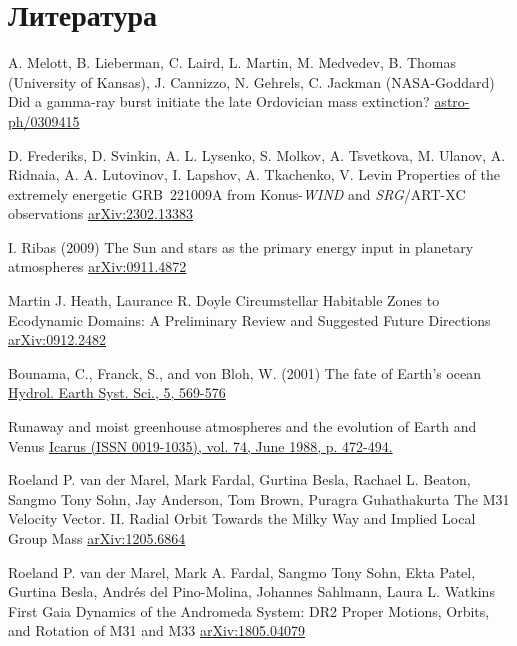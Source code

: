 \documentclass[aspectratio=169]{beamer}
\begin{document}
\section{Литература}
\begin{frame}[allowframebreaks]
\footnotesize{

\begin{thebibliography}{99}
%
A. Melott, B. Lieberman, C. Laird, L. Martin, M. Medvedev, B. Thomas (University of Kansas), J. Cannizzo, N. Gehrels, C. Jackman (NASA-Goddard) 
\newblock Did a gamma-ray burst initiate the late Ordovician mass extinction?
\newblock \href{http://arxiv.org/abs/astro-ph/0309415}{astro-ph/0309415}

%
D. Frederiks, D. Svinkin, A. L. Lysenko, S. Molkov, A. Tsvetkova, M. Ulanov, A. Ridnaia, A. A. Lutovinov, I. Lapshov, A. Tkachenko, V. Levin
\newblock Properties of the extremely energetic GRB~221009A from Konus-\textit{WIND} and \textit{SRG}/ART-XC observations
\newblock \href{http://arxiv.org/abs/2302.13383}{arXiv:2302.13383}


I. Ribas (2009)
\newblock The Sun and stars as the primary energy input in planetary atmospheres
\newblock \href{http://arxiv.org/abs/0911.4872}{arXiv:0911.4872}

Martin J. Heath, Laurance R. Doyle
\newblock Circumstellar Habitable Zones to Ecodynamic Domains: A Preliminary Review and Suggested Future Directions
\newblock \href{http://arxiv.org/abs/0912.2482}{arXiv:0912.2482}

Bounama, C., Franck, S., and von Bloh, W. (2001)
\newblock The fate of Earth's ocean
\newblock \href{http://doi.org/10.1016/0019-1035(88)90116-9}{Hydrol. Earth Syst. Sci., 5, 569-576}

\newblock Runaway and moist greenhouse atmospheres and the evolution of Earth and Venus
\newblock \href{https://doi.org/10.1016/0019-1035(88)90116-9}{Icarus (ISSN 0019-1035), vol. 74, June 1988, p. 472-494.}

Roeland P. van der Marel, Mark Fardal, Gurtina Besla, Rachael L. Beaton, Sangmo Tony Sohn, Jay Anderson, Tom Brown, Puragra Guhathakurta
\newblock The M31 Velocity Vector. II. Radial Orbit Towards the Milky Way and Implied Local Group Mass
\newblock \href{http://arxiv.org/abs/1205.6863}{arXiv:1205.6864}

Roeland P. van der Marel, Mark A. Fardal, Sangmo Tony Sohn, Ekta Patel, Gurtina Besla, Andrés del Pino-Molina, Johannes Sahlmann, Laura L. Watkins
\newblock First Gaia Dynamics of the Andromeda System: DR2 Proper Motions, Orbits, and Rotation of M31 and M33
\newblock \href{http://arxiv.org/abs/1805.04079}{arXiv:1805.04079}


\end{thebibliography}}
\end{frame}
\end{document}
